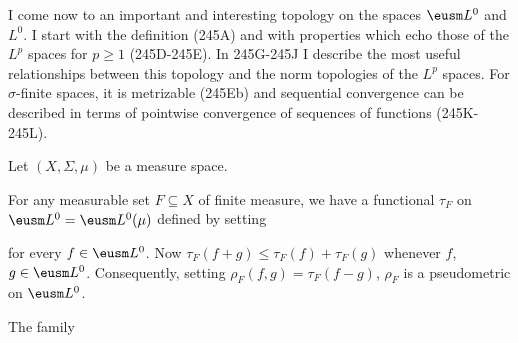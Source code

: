 \def\halfarrow{\rightharpoonup}

\loadeusm

\def\chaptername{Function spaces}
\def\sectionname{Convergence in measure}


I come now to an
important and interesting topology on the spaces $\eusm L^0$ and $L^0$.
I start with the definition (245A) and with properties which echo those
of the $L^p$ spaces for $p\ge 1$ (245D-245E).   In 245G-245J I describe
the most useful relationships between this topology and the norm
topologies of the $L^p$ spaces.   For $\sigma$-finite spaces, it is
metrizable (245Eb) and sequential convergence can be described in terms
of pointwise convergence of sequences of functions (245K-245L).

  Let $(X,\Sigma,\mu)$ be a measure space.

   For any measurable set $F\subseteq X$ of
finite measure, we have a functional $\tau_F$ on 
$\eusm L^0=\eusm L^0(\mu)$ defined by setting


\noindent for every $f\in\eusm L^0$.
Now $\tau_F(f+g)\le\tau_F(f)+\tau_F(g)$ whenever $f$, $g\in\eusm L^0$.
Consequently, setting $\rho_F(f,g)=\tau_F(f-g)$, $\rho_F$ is a pseudometric on $\eusm L^0$.

 The family


